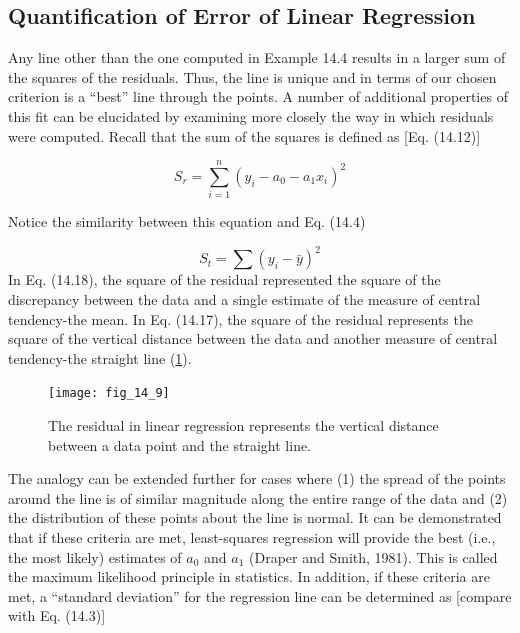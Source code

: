 \documentclass[../main.tex]{subfiles}
\begin{document}
\label{cha:cha_P_14_3_3}
\subsection{Quantification of Error of Linear Regression}

\noindent Any line other than the one computed in Example 14.4 results in a larger sum of the squares of the residuals. Thus, the line is unique and in terms of our chosen criterion is a ``best'' line through the points. A number of additional properties of this fit can be elucidated by examining more closely the way in which residuals were computed. Recall that the sum of the squares is defined as [Eq. (14.12)]

\begin{equation}
	\tag{14.17}
	S_r = \sum^n_{i=1} (y_i - a_0 - a_1 x_i)^2
\end{equation}

Notice the similarity between this equation and Eq. (14.4)

\begin{equation}
\tag{14.18}
S_t = \sum (y_i - \bar{y})^2
\end{equation}
In Eq. (14.18), the square of the residual represented the square of the discrepancy between the data and a single estimate of the measure of central tendency-the mean. In Eq. (14.17), the square of the residual represents the square of the vertical distance between the data and another measure of central tendency-the straight line (\ref{fig:fig_14_9}).

\begin{figure}
    \centering
    \texttt{[image: fig\_14\_9]}
   \caption{\textsf{The residual in linear regression represents the vertical distance between a data point and the straight line.}}
   \label{fig:fig_14_9}
\end{figure}

The analogy can be extended further for cases where (1) the spread of the points around the line is of similar magnitude along the entire range of the data and (2) the distribution of these points about the line is normal. It can be demonstrated that if these criteria are met, least-squares regression will provide the best (i.e., the most likely) estimates of $a_0$ and $a_1$ (Draper and Smith, 1981). This is called the maximum likelihood principle in statistics. In addition, if these criteria are met, a ``standard deviation'' for the regression line can be determined as [compare with Eq. (14.3)]
\end{document}

